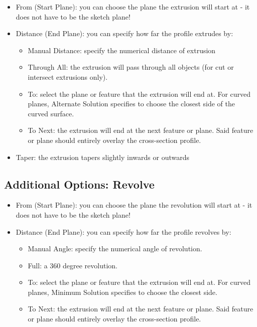 \begin{itemize}
    \item From (Start Plane): you can choose the plane the extrusion will start at - it does not have to be the sketch plane!
    \item Distance (End Plane): you can specify how far the profile extrudes by:
    
    \begin{itemize}
        \item Manual Distance: specify the numerical distance of extrusion
        \item Through All: the extrusion will pass through all objects (for cut or intersect extrusions only).
        \item To: select the plane or feature that the extrusion will end at. For curved planes, Alternate Solution specifies to choose the closest side of the curved surface.
        \item To Next: the extrusion will end at the next feature or plane. Said feature or plane should entirely overlay the cross-section profile.
    \end{itemize}

    \item Taper: the extrusion tapers slightly inwards or outwards

\end{itemize}

\subsection{Additional Options: Revolve}

\begin{itemize}
    \item From (Start Plane): you can choose the plane the revolution will start at - it does not have to be the sketch plane!
    \item Distance (End Plane): you can specify how far the profile revolves by:
    
    \begin{itemize}
        \item Manual Angle: specify the numerical angle of revolution.
        \item Full: a 360 degree revolution.
        \item To: select the plane or feature that the extrusion will end at. For curved planes, Minimum Solution specifies to choose the closest side.
        \item To Next: the extrusion will end at the next feature or plane. Said feature or plane should entirely overlay the cross-section profile.
    \end{itemize}

\end{itemize}

